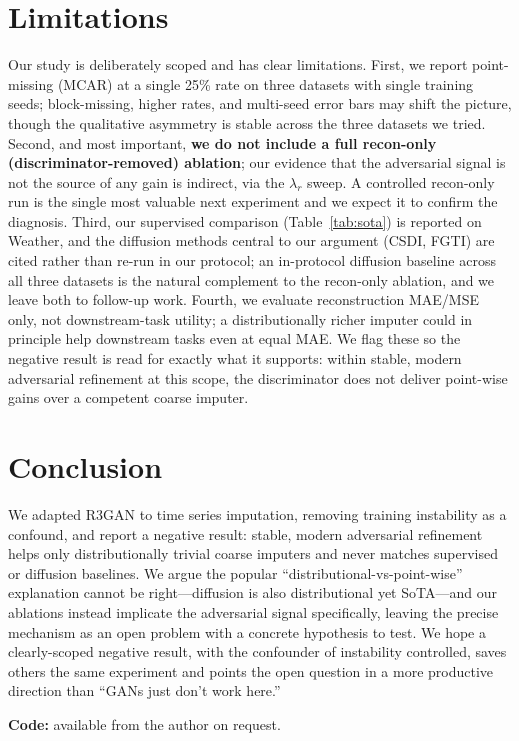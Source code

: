 \documentclass[sigconf,nonacm]{acmart}
\begin{document}
\section{Limitations}

Our study is deliberately scoped and has clear limitations.
First, we report point-missing (MCAR) at a single 25\% rate on three datasets with single training seeds; block-missing, higher rates, and multi-seed error bars may shift the picture, though the qualitative asymmetry is stable across the three datasets we tried.
Second, and most important, \textbf{we do not include a full recon-only (discriminator-removed) ablation}; our evidence that the adversarial signal is not the source of any gain is indirect, via the $\lambda_r$ sweep. A controlled recon-only run is the single most valuable next experiment and we expect it to confirm the diagnosis.
Third, our supervised comparison (Table~\ref{tab:sota}) is reported on Weather, and the diffusion methods central to our argument (CSDI, FGTI) are cited rather than re-run in our protocol; an in-protocol diffusion baseline across all three datasets is the natural complement to the recon-only ablation, and we leave both to follow-up work.
Fourth, we evaluate reconstruction MAE/MSE only, not downstream-task utility; a distributionally richer imputer could in principle help downstream tasks even at equal MAE.
We flag these so the negative result is read for exactly what it supports: within stable, modern adversarial refinement at this scope, the discriminator does not deliver point-wise gains over a competent coarse imputer.

\section{Conclusion}

We adapted R3GAN to time series imputation, removing training instability as a confound, and report a negative result: stable, modern adversarial refinement helps only distributionally trivial coarse imputers and never matches supervised or diffusion baselines.
We argue the popular ``distributional-vs-point-wise'' explanation cannot be right---diffusion is also distributional yet SoTA---and our ablations instead implicate the adversarial signal specifically, leaving the precise mechanism as an open problem with a concrete hypothesis to test.
We hope a clearly-scoped negative result, with the confounder of instability controlled, saves others the same experiment and points the open question in a more productive direction than ``GANs just don't work here.''

\textbf{Code:} available from the author on request.



\end{document}
